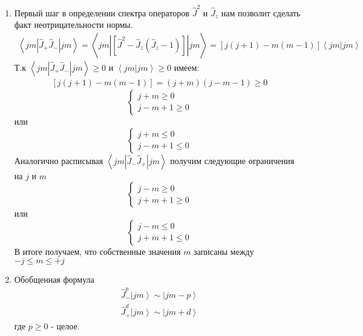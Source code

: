 \documentclass[__main__.tex]{subfiles}
\begin{document}
	\begin{enumerate}
		\item Первый шаг в определении спектра операторов $\hat{J}^2$ и $\hat{J}_z$ нам позволит сделать факт неотрицательности нормы.
			\begin{gather*}
				\left<jm|\hat{J}_{+}\hat{J}_{-}|jm\right> = \left<jm\left|\left[\hat{J}^2-\hat{J}_z\left(\hat{J}_z-1\right)\right]\right|jm\right> = \left[j(j+1)-m(m-1)\right]\left<jm|jm\right>
			\end{gather*}
			Т.к $\left<jm|\hat{J}_{+}\hat{J}_{-}|jm\right> \geq 0$ и $\left<jm|jm\right> \geq 0$ имеем:
			\begin{gather*}
				\left[j(j+1)-m(m-1)\right] = (j+m)(j-m-1) \geq 0
			\end{gather*}
			\begin{equation*}
				\begin{cases}
					j+m \geq 0\\
					j-m+1 \geq 0
				\end{cases}
			\end{equation*}
			или
			\begin{equation*}
				\begin{cases}
					j+m \leq 0\\
					j-m+1 \leq 0
				\end{cases}
			\end{equation*}
			Аналогично расписывая $	\left<jm|\hat{J}_{-}\hat{J}_{+}|jm\right>$ получим следующие ограничения на $j$ и $m$
			\begin{equation*}
				\begin{cases}
					j-m \geq 0\\
					j+m+1 \geq 0
				\end{cases}
			\end{equation*}
			или
			\begin{equation*}
				\begin{cases}
					j-m \leq 0\\
					j+m+1 \leq 0
				\end{cases}
			\end{equation*}
			В итоге получаем, что собственные значения $m$ записаны между $-j\leq m \leq +j$
		\item Обобщенная формула
			\begin{gather*}
				\hat{J}^p_{-}\left|jm\right> \sim \left|jm-p\right>\\
				\hat{J}^d_{+}\left|jm\right> \sim \left|jm+d\right>
			\end{gather*}  	
			где $p \geq 0$ - целое.\\

\end{enumerate}
\end{document}
